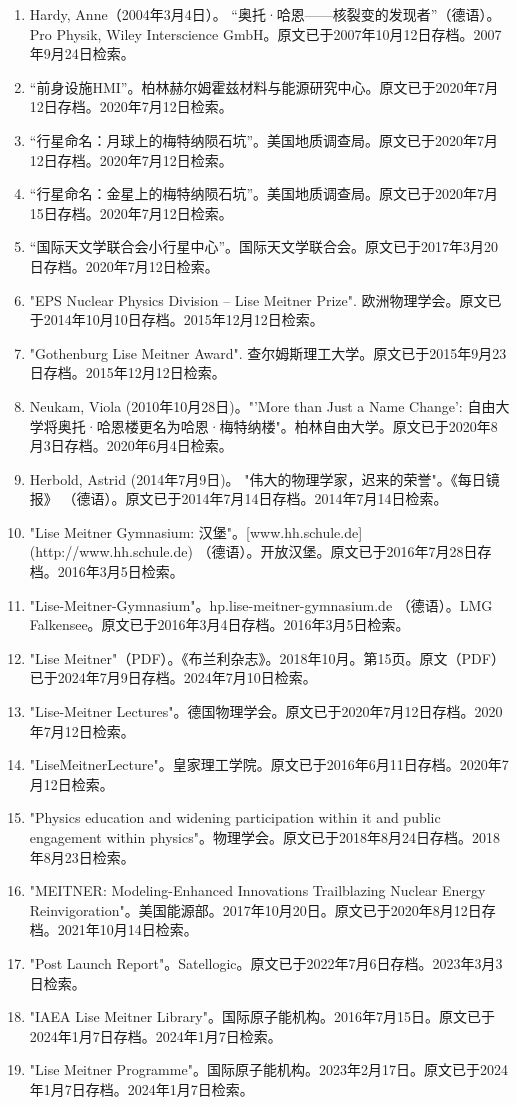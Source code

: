 \begin{enumerate}
\item Hardy, Anne（2004年3月4日）。 “奥托·哈恩——核裂变的发现者”（德语）。Pro Physik, Wiley Interscience GmbH。原文已于2007年10月12日存档。2007年9月24日检索。
\item “前身设施HMI”。柏林赫尔姆霍兹材料与能源研究中心。原文已于2020年7月12日存档。2020年7月12日检索。
\item “行星命名：月球上的梅特纳陨石坑”。美国地质调查局。原文已于2020年7月12日存档。2020年7月12日检索。
\item “行星命名：金星上的梅特纳陨石坑”。美国地质调查局。原文已于2020年7月15日存档。2020年7月12日检索。
\item “国际天文学联合会小行星中心”。国际天文学联合会。原文已于2017年3月20日存档。2020年7月12日检索。
\item "EPS Nuclear Physics Division – Lise Meitner Prize". 欧洲物理学会。原文已于2014年10月10日存档。2015年12月12日检索。
\item "Gothenburg Lise Meitner Award". 查尔姆斯理工大学。原文已于2015年9月23日存档。2015年12月12日检索。
\item Neukam, Viola (2010年10月28日)。"'More than Just a Name Change': 自由大学将奥托·哈恩楼更名为哈恩·梅特纳楼"。柏林自由大学。原文已于2020年8月3日存档。2020年6月4日检索。
\item Herbold, Astrid (2014年7月9日)。 "伟大的物理学家，迟来的荣誉"。《每日镜报》 （德语）。原文已于2014年7月14日存档。2014年7月14日检索。
\item "Lise Meitner Gymnasium: 汉堡"。[www.hh.schule.de](http://www.hh.schule.de) （德语）。开放汉堡。原文已于2016年7月28日存档。2016年3月5日检索。
\item "Lise-Meitner-Gymnasium"。hp.lise-meitner-gymnasium.de （德语）。LMG Falkensee。原文已于2016年3月4日存档。2016年3月5日检索。
\item "Lise Meitner"（PDF）。《布兰利杂志》。2018年10月。第15页。原文（PDF）已于2024年7月9日存档。2024年7月10日检索。
\item "Lise-Meitner Lectures"。德国物理学会。原文已于2020年7月12日存档。2020年7月12日检索。
\item "LiseMeitnerLecture"。皇家理工学院。原文已于2016年6月11日存档。2020年7月12日检索。
\item "Physics education and widening participation within it and public engagement within physics"。物理学会。原文已于2018年8月24日存档。2018年8月23日检索。
\item "MEITNER: Modeling-Enhanced Innovations Trailblazing Nuclear Energy Reinvigoration"。美国能源部。2017年10月20日。原文已于2020年8月12日存档。2021年10月14日检索。
\item "Post Launch Report"。Satellogic。原文已于2022年7月6日存档。2023年3月3日检索。
\item "IAEA Lise Meitner Library"。国际原子能机构。2016年7月15日。原文已于2024年1月7日存档。2024年1月7日检索。
\item "Lise Meitner Programme"。国际原子能机构。2023年2月17日。原文已于2024年1月7日存档。2024年1月7日检索。
\end{enumerate}
